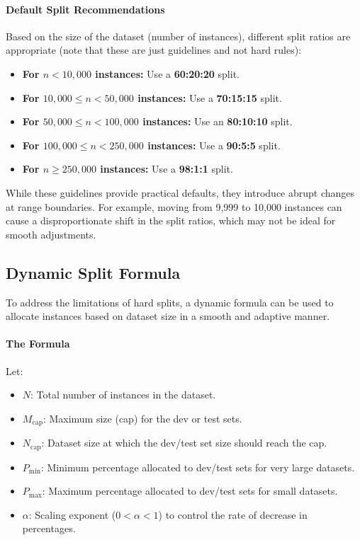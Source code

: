 \documentclass[12pt,openany]{book}
\begin{document}
\paragraph{Default Split Recommendations}
Based on the size of the dataset (number of instances), different split ratios are appropriate (note that these are just guidelines and not hard rules):
\begin{itemize}
    \item \textbf{For $n < 10,000$ instances:} Use a \textbf{60:20:20} split.
    \item \textbf{For $10,000 \leq n < 50,000$ instances:} Use a \textbf{70:15:15} split.
    \item \textbf{For $50,000 \leq n < 100,000$ instances:} Use an \textbf{80:10:10} split.
    \item \textbf{For $100,000 \leq n < 250,000$ instances:} Use a \textbf{90:5:5} split.
    \item \textbf{For $n \geq 250,000$ instances:} Use a \textbf{98:1:1} split.
\end{itemize}

While these guidelines provide practical defaults, they introduce abrupt changes at range boundaries. For example, moving from 9,999 to 10,000 instances can cause a disproportionate shift in the split ratios, which may not be ideal for smooth adjustments.

\subsection{Dynamic Split Formula}

To address the limitations of hard splits, a dynamic formula can be used to allocate instances based on dataset size in a smooth and adaptive manner. 

\paragraph{The Formula}
Let:
\begin{itemize}
    \item \(N\): Total number of instances in the dataset.
    \item \(M_{\text{cap}}\): Maximum size (cap) for the dev or test sets.
    \item \(N_{\text{cap}}\): Dataset size at which the dev/test set size should reach the cap.
    \item \(P_{\text{min}}\): Minimum percentage allocated to dev/test sets for very large datasets.
    \item \(P_{\text{max}}\): Maximum percentage allocated to dev/test sets for small datasets.
    \item \(\alpha\): Scaling exponent (\(0 < \alpha < 1\)) to control the rate of decrease in percentages.
\end{itemize} 
\end{document}
